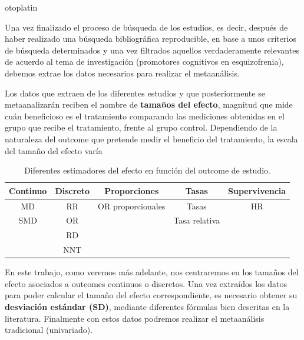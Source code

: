 otoplatin\documentclass[a4paper,openright,12pt]{report}
\begin{document}
Una vez finalizado el proceso de búsqueda de los estudios, es decir, después de haber realizado una búsqueda bibliográfica reproducible,  en base a unos criterios de búsqueda determinados y una vez filtrados aquellos verdaderamente relevantes de acuerdo al tema de investigación (promotores cognitivos en esquizofrenia), debemos extrae los datos necesarios para realizar el metaanálisis.

Los datos que extraen de los diferentes estudios y que posteriormente se metaanalizarán reciben el nombre de \textbf{tamaños del efecto}, magnitud que mide cuán beneficioso es el tratamiento comparando las mediciones obtenidas en el grupo que recibe el tratamiento, frente al grupo control. Dependiendo de la naturaleza del outcome que pretende medir el beneficio del tratamiento, la escala del tamaño del efecto varía \cite{Cochrane_man}
\newline
\begin{table}[!hbt]
\begin{center}
\begin{tabular}{|c|c|c|c|c|}\hline
Continuo & Discreto & Proporciones & Tasas & Supervivencia \\\hline
MD & RR & OR proporcionales & Tasas & HR \\\hline
SMD & OR &  & Tasa relativa & \\\hline
 & RD &  &  & \\\hline
 & NNT &  &  & \\\hline
\end{tabular}
\caption{Diferentes estimadores del efecto en función del outcome de estudio.}
\end{center}
\end{table}

En este trabajo, como veremos más adelante, nos centraremos en los tamaños del efecto asociados a outcomes continuos o discretos. Una vez extraídos los datos para poder calcular el  tamaño del efecto correspondiente, es necesario obtener su \textbf{desviación estándar (SD)}, mediante diferentes fórmulas bien descritas en la literatura. Finalmente con estos datos podremos realizar el metaanálisis tradicional (univariado).
\end{document}
